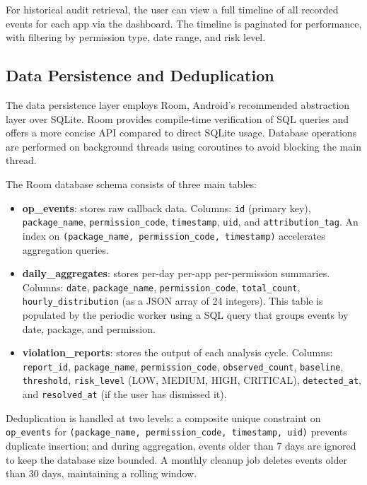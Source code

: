 For historical audit retrieval, the user can view a full timeline of all recorded events for each app via the dashboard. The timeline is paginated for performance, with filtering by permission type, date range, and risk level.

\subsection{Data Persistence and Deduplication}

The data persistence layer employs Room, Android's recommended abstraction layer over SQLite. Room provides compile-time verification of SQL queries and offers a more concise API compared to direct SQLite usage. Database operations are performed on background threads using coroutines to avoid blocking the main thread.

The Room database schema consists of three main tables:
\begin{itemize}
\item \textbf{op\_events}: stores raw callback data. Columns: \texttt{id} (primary key), \texttt{package\_name}, \texttt{permission\_code}, \texttt{timestamp}, \texttt{uid}, and \texttt{attribution\_tag}. An index on \texttt{(package\_name, permission\_code, timestamp)} accelerates aggregation queries.
\item \textbf{daily\_aggregates}: stores per-day per-app per-permission summaries. Columns: \texttt{date}, \texttt{package\_name}, \texttt{permission\_code}, \texttt{total\_count}, \texttt{hourly\_distribution} (as a JSON array of 24 integers). This table is populated by the periodic worker using a SQL query that groups events by date, package, and permission.
\item \textbf{violation\_reports}: stores the output of each analysis cycle. Columns: \texttt{report\_id}, \texttt{package\_name}, \texttt{permission\_code}, \texttt{observed\_count}, \texttt{baseline}, \texttt{threshold}, \texttt{risk\_level} (LOW, MEDIUM, HIGH, CRITICAL), \texttt{detected\_at}, and \texttt{resolved\_at} (if the user has dismissed it).
\end{itemize}

Deduplication is handled at two levels: a composite unique constraint on \texttt{op\_events} for \texttt{(package\_name, permission\_code, timestamp, uid)} prevents duplicate insertion; and during aggregation, events older than 7 days are ignored to keep the database size bounded. A monthly cleanup job deletes events older than 30 days, maintaining a rolling window.

